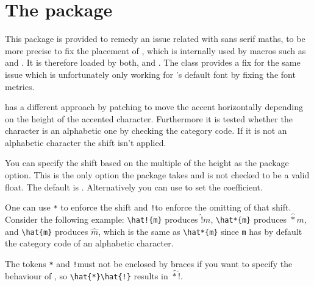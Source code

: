 \chapter{The  package}
This package is provided to remedy an issue related with sans serif maths, to be
more precise to fix the placement of , which is internally used
by macros such as  and . It is therefore loaded by both,
 and . The  class provides a fix for the
same issue which is unfortunately only working for 's default font
by fixing the font metrics.

 has a different approach by patching  to move the
accent horizontally depending on the height of the accented character.
Furthermore it is tested whether the character is an alphabetic one by checking
the category code. If it is not an alphabetic character the shift isn't applied.

You can specify the shift based on the multiple of the height as the package
option. This is the only option the package takes and is not checked to be a
valid float. The default is \makeatletter\texttt{\MRTsfacc@shift}\makeatother.
Alternatively you can use  to set the coefficient.

One can use \texttt{*} to enforce the shift and \texttt{!}\@ to enforce the
omitting of that shift. Consider the following example:
\verb$\hat!{m}$ produces $\hat!{m}$, \verb$\hat*{m}$ produces $\hat*{m}$, and
\verb$\hat{m}$ produces $\hat{m}$, which is the same as \verb$\hat*{m}$ since
\texttt{m} has by default the category code of an alphabetic character.

The tokens \texttt{*} and \texttt{!}\@ must not be enclosed by braces if you
want to specify the behaviour of , so \verb$\hat{*}\hat{!}$
results in $\hat{*}\hat{!}$.

